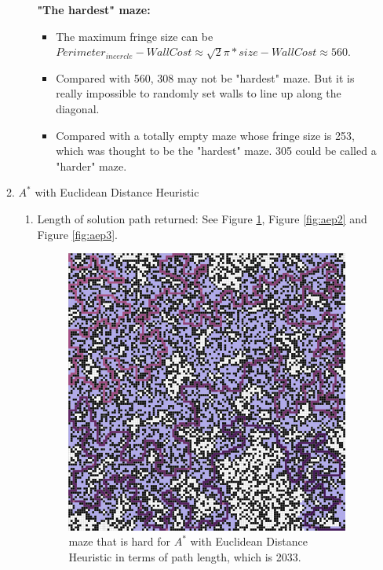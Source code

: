 \documentclass[letter]{article}
\begin{document}
\begin{enumerate}[resume]
\begin{enumerate}
\begin{enumerate}
				\textbf{"The hardest" maze:} 
				\begin{itemize}
					\item {The maximum fringe size can be $Perimeter_{incercle} - WallCost \approx \sqrt2 \pi *size - WallCost \approx 560$.}
					\item {Compared with 560, 308 may not be "hardest" maze. But it is really impossible to randomly set walls to line up along the diagonal.}
					\item {Compared with a totally empty maze whose fringe size is 253, which was thought to be the "hardest" maze. 305 could be called a "harder" maze.}
				\end{itemize}
			\end{enumerate}
			
			\item {$ A^* $ with Euclidean Distance Heuristic}
			\label{A*E} 
			\begin{enumerate}
				\item {Length of solution path returned: See Figure \ref{fig:aep1}, Figure \ref{fig:aep2} and Figure \ref{fig:aep3}.} \\
				\begin{figure}
					\minipage{\textwidth}
					
					\includegraphics[width=\textwidth]{../pics/aep/2033.png}
					\caption{\label{fig:aep1}maze that is hard for $ A^* $ with Euclidean Distance Heuristic in terms of path length, which is 2033.}
					

\end{figure}
\end{enumerate}
\end{enumerate}
\end{enumerate}
\end{document}
